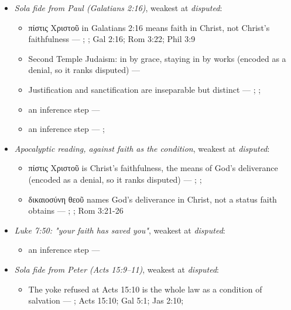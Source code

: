 \documentclass[11pt]{article}
\begin{document}
\begin{itemize}
\item \emph{Sola fide from Paul (Galatians 2:16)}, weakest at \emph{disputed}:
\begin{itemize}
\item πίστις Χριστοῦ in Galatians 2:16 means faith in Christ, not Christ's faithfulness --- \cite{dunn-once-more-pistis-christou-1991}; \cite{matlock-detheologizing-2000}; Gal 2:16; Rom 3:22; Phil 3:9
\item Second Temple Judaism: in by grace, staying in by works (encoded as a denial, so it ranks disputed) --- \cite{sanders-paul-palestinian-judaism-1977}
\item Justification and sanctification are inseparable but distinct --- \cite[XIII.1]{westminster-confession-1647}; \cite[XI.1]{westminster-confession-1647}; \cite[III.xi.6]{calvin-institutes-1960}
\item an inference step --- \cite[Trent, Session VI (1547), canon 9]{tanner-decrees-1990}
\item an inference step --- \cite{gathercole-where-boasting-2002}; \cite{carson-variegated-nomism-1-2001}
\end{itemize}
\item \emph{Apocalyptic reading, against faith as the condition}, weakest at \emph{disputed}:
\begin{itemize}
\item πίστις Χριστοῦ is Christ's faithfulness, the means of God's deliverance (encoded as a denial, so it ranks disputed) --- \cite{campbell-deliverance-god-2009}; \cite[ad loc. Gal 2:16]{martyn-galatians-1997}; \cite{hays-faith-jesus-christ-2002}
\item δικαιοσύνη θεοῦ names God's deliverance in Christ, not a status faith obtains --- \cite{campbell-deliverance-god-2009}; \cite{martyn-galatians-1997}; Rom 3:21-26
\end{itemize}
\item \emph{Luke 7:50: "your faith has saved you"}, weakest at \emph{disputed}:
\begin{itemize}
\item an inference step --- \cite[Trent, Session VI (1547), canon 9]{tanner-decrees-1990}
\end{itemize}
\item \emph{Sola fide from Peter (Acts 15:9–11)}, weakest at \emph{disputed}:
\begin{itemize}
\item The yoke refused at Acts 15:10 is the whole law as a condition of salvation --- \cite[ad loc. Acts 15:10]{bruce-acts-1988}; Acts 15:10; Gal 5:1; Jas 2:10; \cite{das-paul-law-covenant-2001}

\end{itemize}
\end{itemize}
\end{document}
